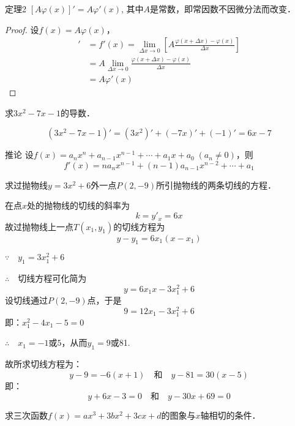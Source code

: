 \begin{blk}
{定理2} $[A\varphi (x)]'=A\varphi'(x)$, 其中$A$是常数，即常因数不因微分法而改变．    
\end{blk}

\begin{proof}
设$f(x)=A\varphi(x)$， 
\begin{align*}
    [A\varphi(x)]'&=f'(x)=\lim_{\Delta x\to 0}\left[A\frac{\varphi(x+\Delta x)-\varphi(x)}{\Delta x}\right]\\
    &=A\lim_{\Delta x\to 0}\frac{\varphi(x+\Delta x)-\varphi(x)}{\Delta x}\\
    &=A\varphi'(x)
\end{align*}
\end{proof}

\begin{example}
    求$3x^2-7x-1$的导数．
\end{example}

\begin{solution}
\[  (3x^2-7x-1)'=(3x^2)'+(-7x)'+(-1)'=6x-7\]
\end{solution}    

\begin{blk}{推论}
设$f(x)=a_nx^n+a_{n-1}x^{n-1}+\cdots+a_1x+a_0\; (a_n\ne 0)$，则
\[f'(x)=na_nx^{n-1}+(n-1)a_{n-1}x^{n-2}+\cdots+a_1\]
\end{blk}

\begin{example}
求过抛物线$y=3x^2+6$外一点$P(2,-9)$所引抛物线的两条切线的方程．
\end{example}

\begin{solution}
在点$x$处的抛物线的切线的斜率为
\[k=y'_x=6x\]
故过抛物线上一点$T(x_1,y_1)$的切线方程为
\[y-y_1=6x_1 (x-x_1)\] 

$\because\quad y_1=3x^2_1+6$

$\therefore\quad $切线方程可化简为
\[    y=6x_1x-3x_1^2+6\]
设切线通过$P(2,-9)$点，于是
\[9=12x_1-3x_1^2+6\]
即：$x_1^2-4x_1-5=0$

$\therefore\quad x_1=-1$或$5$，从而$y_1=9$或81.

故所求切线方程为：
\[y-9=-6(x+1)\quad\text{和}\quad y-81=30(x-5)\]
即：
\[y+6x-3=0\quad\text{和}\quad  y-30x+69=0\]
\end{solution}

\begin{example}
求三次函数$f(x)=ax^3+3bx^2+3cx+d$的图象与$x$轴相切的条件．
\end{example}

